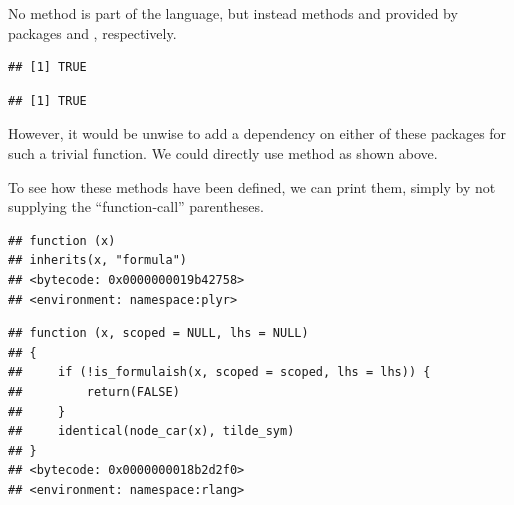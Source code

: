 \documentclass[krantz2]{krantz}\usepackage{knitr}%
\begin{document}
\begin{warningbox}
No method  is part of the \Rlang language, but instead methods  and  provided by packages  and , respectively.

\begin{knitrout}\footnotesize
{}\color{fgcolor}\begin{kframe}
\begin{alltt}
\hlopt{::}
\end{alltt}
\begin{verbatim}
## [1] TRUE
\end{verbatim}
\begin{alltt}
\hlopt{::}
\end{alltt}
\begin{verbatim}
## [1] TRUE
\end{verbatim}
\end{kframe}
\end{knitrout}

However, it would be unwise to add a dependency on either of these packages for such a trivial function. We could directly use \Rlang method  as shown above.

To see how these methods have been defined, we can print them, simply by not supplying the ``function-call'' parentheses.

\begin{knitrout}\footnotesize
{}\color{fgcolor}\begin{kframe}
\begin{alltt}
\hlopt{::}
\end{alltt}
\begin{verbatim}
## function (x) 
## inherits(x, "formula")
## <bytecode: 0x0000000019b42758>
## <environment: namespace:plyr>
\end{verbatim}
\begin{alltt}
\hlopt{::}
\end{alltt}
\begin{verbatim}
## function (x, scoped = NULL, lhs = NULL) 
## {
##     if (!is_formulaish(x, scoped = scoped, lhs = lhs)) {
##         return(FALSE)
##     }
##     identical(node_car(x), tilde_sym)
## }
## <bytecode: 0x0000000018b2d2f0>
## <environment: namespace:rlang>
\end{verbatim}
\end{kframe}
\end{knitrout}


\end{warningbox}
\end{document}
